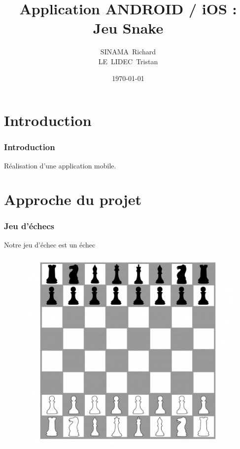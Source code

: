 \documentclass{beamer}
\title[Dev. Mobiles -- L3 info]{Application ANDROID / iOS :\\ Jeu Snake}
\author{SINAMA~Richard \\ LE~LIDEC~Tristan}
\institute[DI]{L3 Informatique}
\date{\today}
\begin{document}
\begin{frame}
  \titlepage
\end{frame}


\section{Introduction}
%
%
\begin{frame}
  \frametitle{Introduction}
  Réalisation d'une application mobile.
\end{frame}
%
%
\section{Approche du projet}
%
%
\begin{frame}
  \frametitle{Jeu d'échecs}
  Notre jeu d'échec est un échec
  \begin{figure}
  	\begin{minipage}[H]{0.5\linewidth}
        \centering
        \includegraphics[scale=0.15]{chessBoard.jpg}
    \end{minipage}\hfill
    \begin{minipage}[H]{0.50\linewidth}
        \centering

\end{minipage}
\end{figure}
\end{frame}
\end{document}
